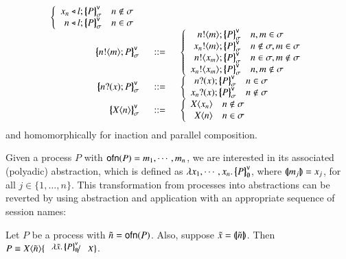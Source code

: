 \begin{definition}
\[\begin{array}{rcl}
		\left\{
		\begin{array}{rl}
			\bsel{x_n}{l} \auxmapp{P}{\mathsf{v}}{\sigma} & n \notin \sigma\\
			\bsel{n}{l} \auxmapp{P}{\mathsf{v}}{\sigma} & n \in \sigma
		\end{array}
		\right.
		\\
		\auxmapp{\bout{n}{m} P}{\mathsf{v}}{\sigma} &\bnfis&
		\left\{
		\begin{array}{rl}
		    \bout{n}{m}\auxmapp{P}{\mathsf{v}}{\sigma} & n, m \in \sigma \\
		    \bout{x_n}{m}\auxmapp{P}{\mathsf{v}}{\sigma} & n \not\in \sigma, m \in \sigma \\
		    \bout{n}{x_m}\auxmapp{P}{\mathsf{v}}{\sigma} & n \in \sigma, m \not\in \sigma \\
		    \bout{x_n}{x_m}\auxmapp{P}{\mathsf{v}}{\sigma} & n, m \not\in \sigma 
		\end{array}
		\right.
		\\
		\auxmapp{\binp{n}{x}P}{\mathsf{v}}{\sigma} &\bnfis&
		\left\{
		\begin{array}{rl}
		    \binp{n}{x}\auxmapp{P}{\mathsf{v}}{\sigma} & n \in \sigma \\
		    \binp{x_n}{x}\auxmapp{P}{\mathsf{v}}{\sigma} & n \not\in \sigma 
		\end{array}
		\right.
		\\
		\auxmapp{\appl{\X}{n}}{\mathsf{v}}{\sigma} &\bnfis&
		\left\{
		\begin{array}{rl}
			\appl{\X}{x_n} & n \notin \sigma\\
			\appl{\X}{n} & n \in \sigma\\
		\end{array}
		\right. 
	\end{array}
\]
and homomorphically for inaction and parallel composition.
\end{definition}

Given a process $P$ with $\mathsf{ofn}(P) = m_1, \cdots, m_n$, we are interested in its associated (polyadic) abstraction, which is defined as
$\lambda x_1, \cdots, x_n.\,\big\{\!\!\big\{P\big\}\!\!\big\}^\mathsf{v}_\emptyset$, where $(\!|\!|m_j|\!|\!) = x_j$, for all $j \in \{1, \ldots, n\}$.
This transformation from processes into abstractions can be reverted by
using abstraction and application with an appropriate sequence of session names:
%
\begin{proposition}\rm
	Let $P$ be a \HOp process with $\tilde{n} = \mathsf{ofn}(P)$.
	Also, suppose $\tilde{x} = (\!|\!|\tilde{n}|\!|\!)$.
	Then $P \scong \appl{X}{\tilde{n}}\subst{\abs{\tilde{x}}\auxmapp{P}{\mathsf{v}}{\emptyset}}{X}$.
\end{proposition}

